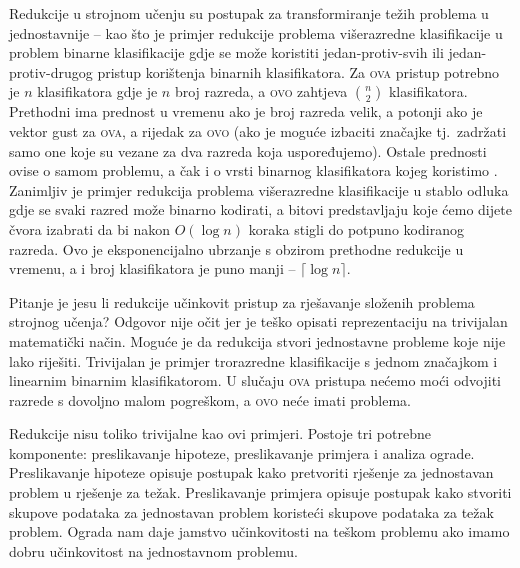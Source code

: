 Redukcije u strojnom učenju su postupak za transformiranje težih problema u
jednostavnije -- kao što je primjer redukcije problema višerazredne
klasifikacije u problem binarne klasifikacije gdje se može koristiti
jedan-protiv-svih  ili
jedan-protiv-drugog  pristup
korištenja binarnih klasifikatora. Za \textsc{ova} pristup potrebno je $n$
klasifikatora gdje je $n$ broj razreda, a \textsc{ovo} zahtjeva $\binom{n}{2}$
klasifikatora. Prethodni ima prednost u vremenu ako je broj razreda velik, a
potonji ako je vektor gust za \textsc{ova}, a rijedak za \textsc{ovo} (ako je
moguće izbaciti značajke tj.~zadržati samo one koje su vezane za dva razreda
koja uspoređujemo). Ostale prednosti ovise o samom problemu, a čak i o vrsti
binarnog klasifikatora kojeg koristimo \citep{milgram2006one}. Zanimljiv je
primjer redukcija problema višerazredne klasifikacije u stablo odluka
 gdje se svaki razred može binarno kodirati, a bitovi
predstavljaju koje ćemo dijete čvora izabrati da bi nakon $O(\log n)$ koraka
stigli do potpuno kodiranog razreda. Ovo je eksponencijalno ubrzanje s obzirom
prethodne redukcije u vremenu, a i broj klasifikatora je puno manji -- $\lceil
\log n \rceil$.

Pitanje je jesu li redukcije učinkovit pristup za rješavanje složenih problema
strojnog učenja? Odgovor nije očit jer je teško opisati reprezentaciju na
trivijalan matematički način. Moguće je da redukcija stvori jednostavne probleme
koje nije lako riješiti. Trivijalan je primjer trorazredne klasifikacije s
jednom značajkom i linearnim binarnim klasifikatorom. U slučaju \textsc{ova}
pristupa nećemo moći odvojiti razrede s dovoljno malom pogreškom, a \textsc{ovo}
neće imati problema.

Redukcije nisu toliko trivijalne kao ovi primjeri. Postoje tri potrebne
komponente: preslikavanje hipoteze, preslikavanje primjera i analiza ograde.
Preslikavanje hipoteze opisuje postupak kako pretvoriti rješenje za jednostavan
problem u rješenje za težak. Preslikavanje primjera opisuje postupak kako
stvoriti skupove podataka za jednostavan problem koristeći skupove podataka za
težak problem. Ograda nam daje jamstvo učinkovitosti na teškom problemu ako
imamo dobru učinkovitost na jednostavnom problemu.

